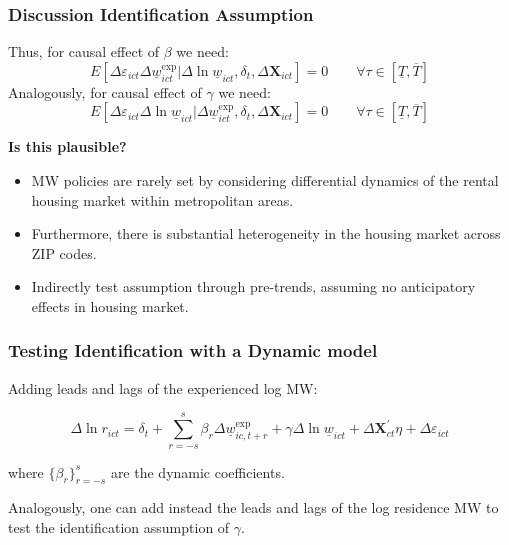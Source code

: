 \documentclass[aspectratio=169, t]{beamer}
\newcommand{\MW}{\underline{w}}
\begin{document}
\begin{frame}
	\frametitle{Discussion Identification Assumption}
	
	Thus, for causal effect of $\beta$ we need:
	$$
	E \left[\Delta \varepsilon_{ict} \Delta \MW^{\text{exp}}_{ict}  
	\big| \Delta \ln \MW_{ict}, \delta_t, \Delta 
	\mathbf{X}_{ict} \right] = 0
	\quad \quad \forall \tau \in \left[ \underline{T}, \overline{T} \right]
	$$
	\vspace{.5mm}
	Analogously, for causal effect of $\gamma$ we need:
	$$
	E \left[\Delta \varepsilon_{ict} \Delta \ln \MW_{ict}  
	\big| \Delta \MW^{\text{exp}}_{ict}, \delta_t, \Delta \mathbf{X}_{ict} 
	\right] = 0
	\quad \quad \forall \tau \in \left[ \underline{T}, \overline{T} \right]
	$$
	
	\pause
	\vspace{.5mm}
	\textbf{Is this plausible?}
	\begin{itemize} \small
		\vspace{.5mm}
		\item MW policies are rarely set by considering differential dynamics of the 
		rental housing market within metropolitan areas.
		
		\vspace{.5mm}
		\item Furthermore, there is substantial heterogeneity in the housing market 
		across ZIP codes.
		
		\vspace{.5mm}
		\item Indirectly test assumption through pre-trends, assuming no anticipatory 
		effects in housing market.
	\end{itemize}
\end{frame}

\begin{frame}[label = dyn_model]
	\frametitle{Testing Identification with a Dynamic model}
	
	Adding leads and lags of the experienced log MW:
	
	$$
	\Delta \ln r_{ict} = \delta_t
		+ \sum_{r=-s}^{s} \beta_r \Delta \MW^{\text{exp}}_{ic,t+r}
		+ \gamma \Delta \ln \MW_{ict}
		+ \Delta \mathbf{X}^{'}_{ct}\eta
		+ \Delta \varepsilon_{ict}
    $$
	
	where $\{\beta_r\}_{r=-s}^{s}$ are the dynamic coefficients.
	
	\vspace{1mm}

    Analogously, one can add instead the leads and lags of the log residence MW
    to test the identification assumption of $\gamma$.
\end{frame}
\end{document}
